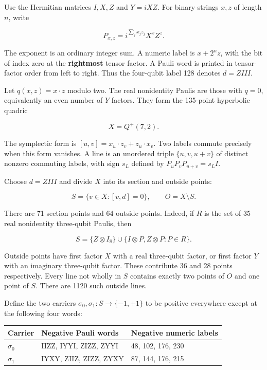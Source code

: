 \documentclass[11pt,letterpaper]{article}
\begin{document}
Use the Hermitian matrices \(I,X,Z\) and \(Y=iXZ\). For binary strings \(x,z\) of length \(n\), write

\[P_{x,z}=i^{\sum_jx_jz_j}X^xZ^z.\]

The exponent is an ordinary integer sum. A numeric label is \(x+2^n z\), with the bit of index zero at the \textbf{rightmost} tensor factor. A Pauli word is printed in tensor-factor order from left to right. Thus the four-qubit label 128 denotes \(d=ZIII\).

Let \(q(x,z)=x\cdot z\) modulo two. The real nonidentity Paulis are those with \(q=0\), equivalently an even number of \(Y\) factors. They form the 135-point hyperbolic quadric

\[X=Q^+(7,2).\]

The symplectic form is \([u,v]=x_u\cdot z_v+z_u\cdot x_v\). Two labels commute precisely when this form vanishes. A line is an unordered triple \(\{u,v,u+v\}\) of distinct nonzero commuting labels, with sign \(s_L\) defined by \(P_uP_vP_{u+v}=s_LI\).

Choose \(d=ZIII\) and divide \(X\) into its section and outside points:

\[S=\{v\in X:[v,d]=0\},\qquad O=X\setminus S.\]

There are 71 section points and 64 outside points. Indeed, if \(R\) is the set of 35 real nonidentity three-qubit Paulis, then

\[S=\{Z\otimes I_8\}\cup
\{I\otimes P,Z\otimes P:P\in R\}.\]

Outside points have first factor \(X\) with a real three-qubit factor, or first factor \(Y\) with an imaginary three-qubit factor. These contribute 36 and 28 points respectively. Every line not wholly in \(S\) contains exactly two points of \(O\) and one point of \(S\). There are 1120 such outside lines.

Define the two carriers \(\sigma_0,\sigma_1:S\to\{-1,+1\}\) to be positive everywhere except at the following four words:

{\def\LTcaptype{table} %
\begin{longtable}[]{@{}lll@{}}
\toprule\noalign{}
Carrier & Negative Pauli words & Negative numeric labels \\
\midrule\noalign{}
\endhead
\bottomrule\noalign{}
\endlastfoot
\(\sigma_0\) & IIZZ, IYYI, ZIZZ, ZYYI & 48, 102, 176, 230 \\
\(\sigma_1\) & IYXY, ZIIZ, ZIZZ, ZYXY & 87, 144, 176, 215 \\
\end{longtable}
}
\end{document}

